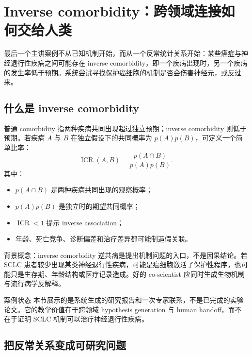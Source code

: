 \section{Inverse comorbidity：跨领域连接如何交给人类}

最后一个主讲案例不从已知机制开始，而从一个反常统计关系开始：某些癌症与神经退行性疾病之间可能存在 inverse comorbidity，即一个疾病出现时，另一个疾病的发生率低于预期。系统尝试寻找保护癌细胞的机制是否会伤害神经元，或反过来。

\subsection{什么是 inverse comorbidity}

普通 comorbidity 指两种疾病共同出现超过独立预期；inverse comorbidity 则低于预期。若疾病 $A$ 与 $B$ 在独立假设下的共同概率为 $p(A)p(B)$，可定义一个简单比率：
$$
\operatorname{ICR}(A,B)=\frac{p(A\cap B)}{p(A)p(B)}.
$$
其中：
\begin{itemize}
  \item $p(A\cap B)$ 是两种疾病共同出现的观察概率；
  \item $p(A)p(B)$ 是独立时的期望共同概率；
  \item $\operatorname{ICR}<1$ 提示 inverse association；
  \item 年龄、死亡竞争、诊断偏差和治疗差异都可能制造假关联。
\end{itemize}

\begin{knowledgebox}{背景概念：inverse comorbidity}
逆共病是提出机制问题的入口，不是因果结论。若 SCLC 患者较少出现某类神经退行性疾病，可能是癌细胞激活了保护性程序，也可能只是生存期、年龄结构或医疗记录造成。好的 co-scientist 应同时生成生物机制与流行病学反解释。
\end{knowledgebox}


\begin{warningbox}{案例状态}
本节展示的是系统生成的研究报告和一次专家联系，不是已完成的实验论文。它的教学价值在于跨领域 hypothesis generation 与 human handoff，而不在于证明 SCLC 机制可以治疗神经退行性疾病。
\end{warningbox}

\subsection{把反常关系变成可研究问题}


